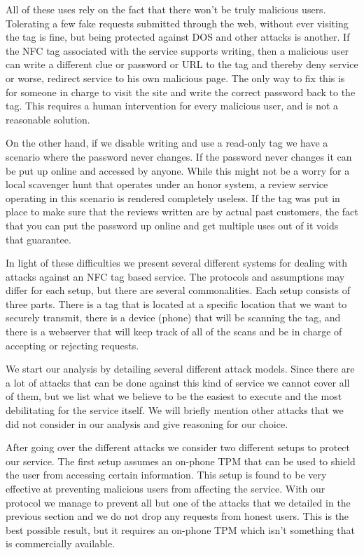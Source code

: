 \documentclass{sig-alternate}
\begin{document}
All of these uses rely on the fact that there won't be truly malicious
users. Tolerating a few fake requests submitted through the web,
without ever visiting the tag is fine, but being protected against DOS
and other attacks is another. If the NFC tag associated with the
service supports writing, then a malicious user can write a different
clue or password or URL to the tag and thereby deny service or worse,
redirect service to his own malicious page. The only way to fix this
is for someone in charge to visit the site and write the correct
password back to the tag. This requires a human intervention for every
malicious user, and is not a reasonable solution.

On the other hand, if we disable writing and use a read-only tag we
have a scenario where the password never changes. If the password
never changes it can be put up online and accessed by anyone. While
this might not be a worry for a local scavenger hunt that operates
under an honor system, a review service operating in this scenario is
rendered completely useless. If the tag was put in place to make sure
that the reviews written are by actual past customers, the fact that
you can put the password up online and get multiple uses out of it
voids that guarantee.

In light of these difficulties we present several different systems
for dealing with attacks against an NFC tag based service. The
protocols and assumptions may differ for each setup, but there are
several commonalities. Each setup consists of three parts. There is a
tag that is located at a specific location that we want to securely
transmit, there is a device (phone) that will be scanning the tag, and
there is a webserver that will keep track of all of the scans and be
in charge of accepting or rejecting requests.

We start our analysis by detailing several different attack
models. Since there are a lot of attacks that can be done against this
kind of service we cannot cover all of them, but we list what we
believe to be the easiest to execute and the most debilitating for the
service itself. We will briefly mention other attacks that we did not
consider in our analysis and give reasoning for our choice.

After going over the different attacks we consider two different
setups to protect our service. The first setup assumes an on-phone TPM
that can be used to shield the user from accessing certain
information. This setup is found to be very effective at preventing
malicious users from affecting the service. With our protocol we
manage to prevent all but one of the attacks that we detailed in the
previous section and we do not drop any requests from honest
users. This is the best possible result, but it requires an on-phone
TPM which isn't something that is commercially available.
\end{document}
